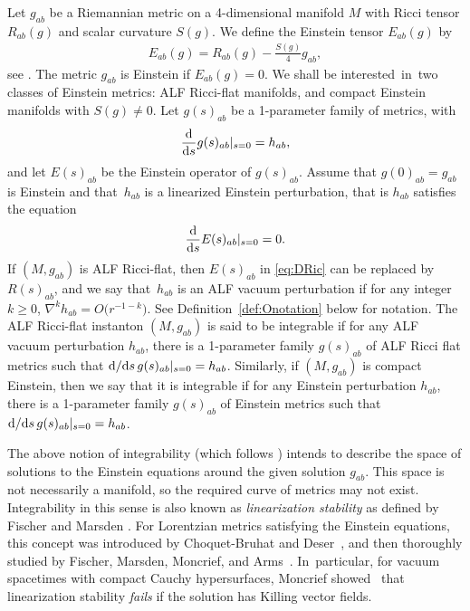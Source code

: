 \documentclass[pdftex]{sigma}
\numberwithin{equation}{section}
\begin{document}
Let $g_{ab}$ be a Riemannian metric on a 4-dimensional manifold $M$ with Ricci tensor $R_{ab}(g)$ and scalar curvature $S(g)$. We define the Einstein tensor $E_{ab}(g)$ by
\begin{align}\label{eq:EinsteinOp}
E_{ab}(g) = R_{ab}(g) - \frac{S(g)}{4}g_{ab},
\end{align}
see \cite[Section~12.26]{MR2371700}. The metric $g_{ab}$ is Einstein if $E_{ab}(g)=0$. We shall be interested~in~two classes of Einstein metrics: ALF Ricci-flat manifolds, and compact Einstein manifolds with ${S(g)\neq 0}$. Let $g(s)_{ab}$ be a 1-parameter family of metrics, with
\begin{align} \label{eq:LinMetric}
\frac{{\rm d}}{{\rm d}s} g(s)_{ab} |_{s=0} = h_{ab},
\end{align}
and let $E(s)_{ab}$ be the Einstein operator of $g(s)_{ab}$. Assume that $g(0)_{ab}=g_{ab}$ is Einstein and that~$h_{ab}$ is a linearized Einstein perturbation, that is $h_{ab}$ satisfies the equation
\begin{align} \label{eq:DRic}
\frac{{\rm d}}{{\rm d}s} E(s)_{ab}|_{s=0} = 0.
\end{align}
If $(M,g_{ab})$ is ALF Ricci-flat, then $E(s)_{ab}$ in \eqref{eq:DRic} can be replaced by $R(s)_{ab}$, and we say that~$h_{ab}$ is an ALF vacuum perturbation if for any integer $k \geq 0$, $\nabla^k h_{ab} = O\bigl(r^{-1-k}\bigr)$. See Definition~\ref{def:Onotation} below for notation. The ALF Ricci-flat instanton $(M,g_{ab})$ is said to be integrable if for any ALF vacuum perturbation $h_{ab}$, there is a 1-parameter family $g(s)_{ab}$ of ALF Ricci flat metrics such that ${\rm d}/{\rm d}s \, g(s)_{ab} |_{s=0} = h_{ab}$.
Similarly, if $(M,g_{ab})$ is compact Einstein, then we say that it is integrable if for any Einstein perturbation $h_{ab}$, there is a 1-parameter family $g(s)_{ab}$ of Einstein metrics such that ${\rm d}/{\rm d}s \, g(s)_{ab}|_{s=0} = h_{ab}$.

The above notion of integrability (which follows \cite[Section 12.E]{MR2371700}) intends to describe the space of solutions to the Einstein equations around the given solution $g_{ab}$. This space is not necessarily a manifold, so the required curve of metrics may not exist. Integrability in this sense is also known as {\em linearization stability} as defined by Fischer and Marsden \cite{fischer_marsden_1975}. For Lorentzian metrics satisfying the Einstein equations, this concept was introduced by Choquet-Bruhat and Deser~\cite{CHOQUETBRUHAT1973165}, and then thoroughly studied by Fischer, Marsden, Moncrief, and Arms~\mbox{\cite{ARMS198281,Fischer1980, fischer_marsden_1973, Moncrief1, Moncrief2}}. In~particular, for vacuum spacetimes with compact Cauchy hypersurfaces, Moncrief showed~\mbox{\cite{Moncrief1, Moncrief2}} that linearization stability {\em fails} if the solution has Killing vector fields.
\end{document}
